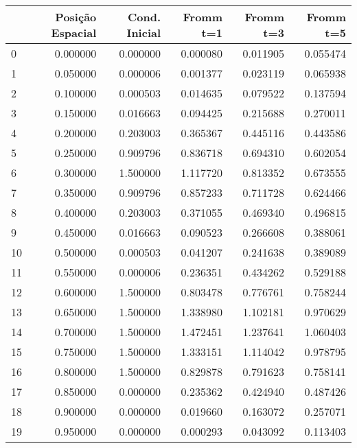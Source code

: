 \begin{tabular}{lrrrrr}
\toprule
 & Posição Espacial & Cond. Inicial & Fromm t=1 & Fromm t=3 & Fromm t=5 \\
\midrule
0 & 0.000000 & 0.000000 & 0.000080 & 0.011905 & 0.055474 \\
1 & 0.050000 & 0.000006 & 0.001377 & 0.023119 & 0.065938 \\
2 & 0.100000 & 0.000503 & 0.014635 & 0.079522 & 0.137594 \\
3 & 0.150000 & 0.016663 & 0.094425 & 0.215688 & 0.270011 \\
4 & 0.200000 & 0.203003 & 0.365367 & 0.445116 & 0.443586 \\
5 & 0.250000 & 0.909796 & 0.836718 & 0.694310 & 0.602054 \\
6 & 0.300000 & 1.500000 & 1.117720 & 0.813352 & 0.673555 \\
7 & 0.350000 & 0.909796 & 0.857233 & 0.711728 & 0.624466 \\
8 & 0.400000 & 0.203003 & 0.371055 & 0.469340 & 0.496815 \\
9 & 0.450000 & 0.016663 & 0.090523 & 0.266608 & 0.388061 \\
10 & 0.500000 & 0.000503 & 0.041207 & 0.241638 & 0.389089 \\
11 & 0.550000 & 0.000006 & 0.236351 & 0.434262 & 0.529188 \\
12 & 0.600000 & 1.500000 & 0.803478 & 0.776761 & 0.758244 \\
13 & 0.650000 & 1.500000 & 1.338980 & 1.102181 & 0.970629 \\
14 & 0.700000 & 1.500000 & 1.472451 & 1.237641 & 1.060403 \\
15 & 0.750000 & 1.500000 & 1.333151 & 1.114042 & 0.978795 \\
16 & 0.800000 & 1.500000 & 0.829878 & 0.791623 & 0.758141 \\
17 & 0.850000 & 0.000000 & 0.235362 & 0.424940 & 0.487426 \\
18 & 0.900000 & 0.000000 & 0.019660 & 0.163072 & 0.257071 \\
19 & 0.950000 & 0.000000 & 0.000293 & 0.043092 & 0.113403 \\
\bottomrule
\end{tabular}
